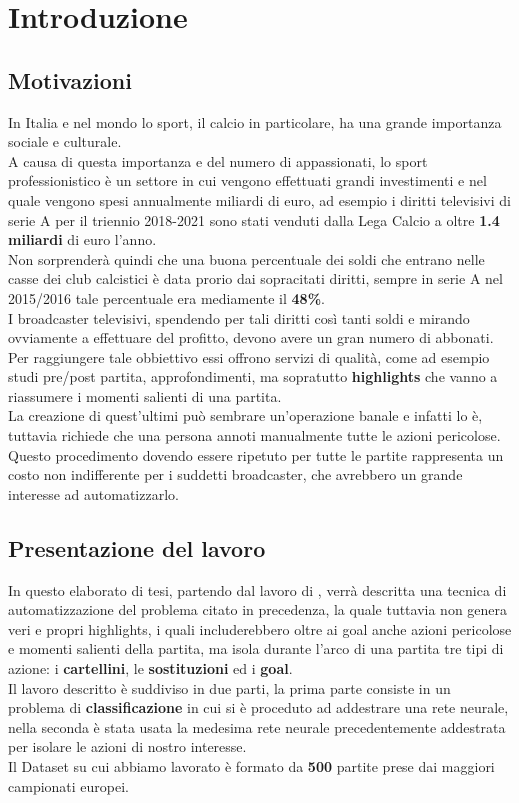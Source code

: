 \chapter{Introduzione}\label{ch:introduzione}
\section*{Motivazioni}
In Italia e nel mondo lo sport, il calcio in particolare, ha una grande importanza sociale e culturale.
\\A causa di questa importanza e del numero di appassionati, lo sport professionistico è un settore in cui vengono effettuati grandi investimenti e nel quale vengono spesi annualmente miliardi di euro, ad esempio i diritti televisivi di serie A per il triennio 2018-2021 sono stati venduti dalla Lega Calcio a oltre \textbf{1.4 miliardi} di euro l'anno. \cite{DirittiTriennio2018-21}
\\Non sorprenderà quindi che una buona percentuale dei soldi che entrano nelle casse dei club calcistici è data prorio dai sopracitati diritti, sempre in serie A nel 2015/2016 tale percentuale era mediamente il \textbf{48\%}. \cite{impattoDirittiTv}
\\I broadcaster televisivi, spendendo per tali diritti così tanti soldi e mirando ovviamente a effettuare del profitto, devono avere un gran numero di abbonati. Per raggiungere tale obbiettivo essi offrono servizi di qualità, come ad esempio studi pre/post partita, approfondimenti, ma sopratutto \textbf{highlights} che vanno a riassumere i momenti salienti di una partita. 
\\La creazione di quest'ultimi può sembrare un'operazione banale e infatti lo è, tuttavia richiede che una persona annoti manualmente tutte le azioni pericolose.
\\Questo procedimento dovendo essere ripetuto per tutte le partite rappresenta un costo non indifferente per i suddetti broadcaster, che avrebbero un grande interesse ad automatizzarlo.
\section*{Presentazione del lavoro}
In questo elaborato di tesi, partendo dal lavoro di \citet{soccerNet} , verrà descritta una tecnica di automatizzazione del problema citato in precedenza, la quale tuttavia non genera veri e propri highlights, i quali includerebbero oltre ai goal anche azioni pericolose e momenti salienti della partita, ma isola durante l'arco di una partita tre tipi di azione: i \textbf{cartellini}, le \textbf{sostituzioni} ed i \textbf{goal}.
\\Il lavoro descritto è suddiviso in due parti, la prima parte consiste in un problema di \textbf{classificazione} in cui si è proceduto ad addestrare una rete neurale, nella seconda è stata usata la medesima rete neurale precedentemente addestrata per isolare le azioni di nostro interesse.
\\Il Dataset su cui abbiamo lavorato è formato da \textbf{500} partite prese dai maggiori campionati europei.


